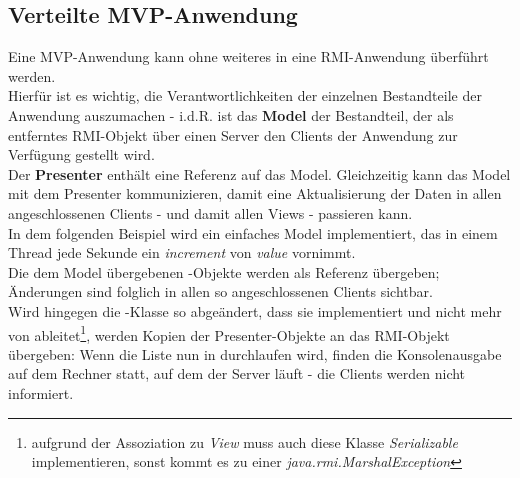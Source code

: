 \subsection{Verteilte MVP-Anwendung}

Eine MVP-Anwendung kann ohne weiteres in eine RMI-Anwendung überführt werden.\\

\noindent
Hierfür ist es wichtig, die Verantwortlichkeiten der einzelnen Bestandteile der Anwendung auszumachen - i.d.R. ist das \textbf{Model} der Bestandteil, der als entferntes RMI-Objekt über einen Server den Clients der Anwendung zur Verfügung gestellt wird.\\

Der \textbf{Presenter} enthält eine Referenz auf das Model.
Gleichzeitig kann das Model mit dem Presenter kommunizieren, damit eine Aktualisierung der Daten in allen angeschlossenen Clients - und damit allen Views - passieren kann.\\

\noindent
In dem folgenden Beispiel wird ein einfaches Model implementiert, das in einem Thread jede Sekunde ein \textit{increment} von \textit{value} vornimmt.\\
Die dem Model übergebenen -Objekte werden als Referenz übergeben; Änderungen sind folglich in allen so angeschlossenen Clients sichtbar.\\
Wird hingegen die -Klasse so abgeändert, dass sie  implementiert und nicht mehr von  ableitet\footnote{
aufgrund der Assoziation zu {\textit{View}} muss auch diese Klasse \textit{Serializable} implementieren, sonst kommt es zu einer {\textit{java.rmi.MarshalException}}
}, werden Kopien der Presenter-Objekte an das RMI-Objekt übergeben: Wenn die Liste nun in  durchlaufen wird, finden die Konsolenausgabe auf dem Rechner statt, auf dem der Server läuft - die Clients werden nicht informiert.


